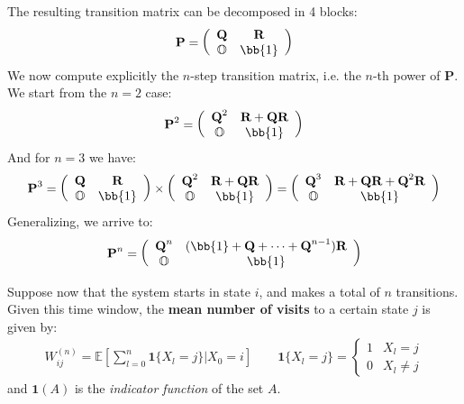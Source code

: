 \documentclass[../template.tex]{subfiles}
\begin{document}
The resulting transition matrix can be decomposed in 4 blocks:
\begin{align*}
    \textbf{P} = \left(\begin{array}{cc}
    \textbf{Q}  & \textbf{R}  \\ 
    \mathbb{O}  & \bb{1}
    \end{array}\right) 
\end{align*}
We now compute explicitly the $n$-step transition matrix, i.e. the $n$-th power of \textbf{P}. We start from the $n=2$ case:
\begin{align*}
    \textbf{P}^2 = \left(\begin{array}{cc}
    \textbf{Q}^2  & \textbf{R}+ \textbf{Q}\textbf{R}    \\ 
    \mathbb{O} & \bb{1}
    \end{array}\right) 
\end{align*} 
And for $n=3$ we have:
\begin{align*}
    \textbf{P}^3 = \left(\begin{array}{cc}
    \textbf{Q}  & \textbf{R}  \\ 
    \mathbb{O} & \bb{1}
    \end{array}\right) \times \left(\begin{array}{cc}
        \textbf{Q}^2  & \textbf{R}+ \textbf{Q}\textbf{R}    \\ 
        \mathbb{O} & \bb{1}
        \end{array}\right)  = 
    \left(\begin{array}{cc}
    \textbf{Q}^3  & \textbf{R} + \textbf{QR} + \textbf{Q}^2\textbf{R}    \\ 
    \mathbb{O} & \bb{1}
    \end{array}\right)
\end{align*}
Generalizing, we arrive to:
\begin{align} \label{eqn:P-n2}
    \textbf{P}^n = \left(\begin{array}{cc}
    \textbf{Q}^n  & (\bb{1} + \textbf{Q} + \dots + \textbf{Q}^{n-1}) \textbf{R}  \\ 
    \mathbb{O} & \bb{1}
    \end{array}\right) 
\end{align}

Suppose now that the system starts in state $i$, and makes a total of $n$ transitions. Given this time window, the \textbf{mean number of visits} to a certain state $j$ is given by:
\begin{align*}
    W_{ij}^{(n)} = \mathbb{E}\left[\sum_{l=0}^n \textbf{1}\{X_l = j\}| X_0 = i \right] \qquad \textbf{1}\{X_l = j\} = \begin{cases}
        1 & X_l = j\\
        0 & X_l \neq j
    \end{cases}
\end{align*} 
and $\textbf{1}(A)$ is the \textit{indicator function} of the set $A$.
\end{document}
